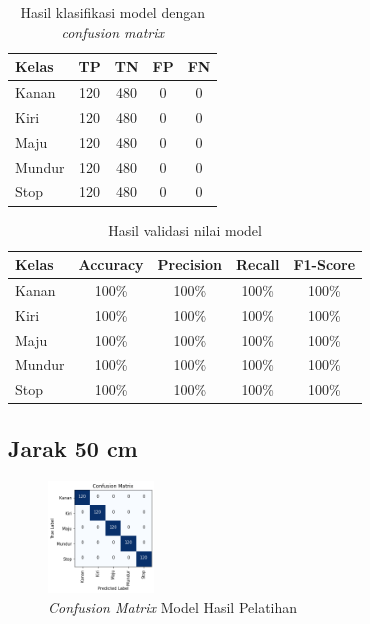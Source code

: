 \begin{longtable}{|l|c|c|c|c|}
  \caption{Hasil klasifikasi model dengan \emph{confusion matrix}}
  \label{tb:cm_model2} \\
  \hline
  \rowcolor[HTML]{C0C0C0} 
  \textbf{Kelas} & \textbf{TP} & \textbf{TN} & \textbf{FP} & \textbf{FN} \\ \hline
  Kanan    & 120          & 480         & 0           & 0           \\ \hline
  Kiri      & 120          & 480         & 0           & 0           \\ \hline
  Maju      & 120          & 480         & 0           & 0           \\ \hline
  Mundur     & 120          & 480         & 0           & 0           \\ \hline
  Stop  & 120          & 480         & 0           & 0           \\ \hline
\end{longtable}

\begin{longtable}{|l|c|c|c|c|}
  \caption{Hasil validasi nilai model}
  \label{tb:vs_model2} \\
  \hline
  \rowcolor[HTML]{C0C0C0} 
  \textbf{Kelas} & \textbf{Accuracy} & \textbf{Precision} & \textbf{Recall} & \textbf{F1-Score} \\ \hline
  Kanan    & 100\%            & 100\%             & 100\%           & 100\%            \\ \hline
  Kiri     & 100\%          & 100\%           & 100\%           & 100\%           \\ \hline
  Maju      & 100\%          & 100\%           & 100\%          & 100\%          \\ \hline
  Mundur     & 100\%            & 100\%             & 100\%           & 100\%            \\ \hline
  Stop  & 100\%            & 100\%             & 100\%           & 100\%            \\ \hline
\end{longtable}

\subsection{Jarak 50 cm}

\begin{figure} [ht] \centering
  \includegraphics[width=0.25\textwidth]{gambar/bab4/model6 (50cm)/matrix.png}
  \caption{\emph{Confusion Matrix} Model Hasil Pelatihan}
  \label{fig:matrix3}
\end{figure}

